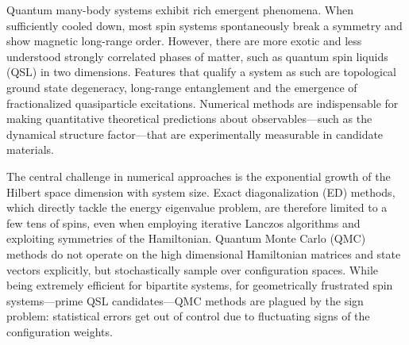 Quantum many-body systems exhibit rich emergent phenomena. When sufficiently cooled down, most spin systems spontaneously break a symmetry and show magnetic long-range order. However, there are more exotic and less understood strongly correlated phases of matter, such as quantum spin liquids (QSL) in two dimensions. Features that qualify a system as such are topological ground state degeneracy, long-range entanglement and the emergence of fractionalized quasiparticle excitations. Numerical methods are indispensable for making quantitative theoretical predictions about observables---such as the dynamical structure factor---that are experimentally measurable in candidate materials. \cite{knolle2019field}

The central challenge in numerical approaches is the exponential growth of the Hilbert space dimension with system size. Exact diagonalization (ED) methods, which directly tackle the energy eigenvalue problem, are therefore limited to a few tens of spins, even when employing iterative Lanczos algorithms and exploiting symmetries of the Hamiltonian. Quantum Monte Carlo (QMC) methods do not operate on the high dimensional Hamiltonian matrices and state vectors explicitly, but stochastically sample over configuration spaces. While being extremely efficient for bipartite systems, for geometrically frustrated spin systems---prime QSL candidates---QMC methods are plagued by the sign problem: statistical errors get out of control due to fluctuating signs of the configuration weights. \cite{sandvik2010computational}


